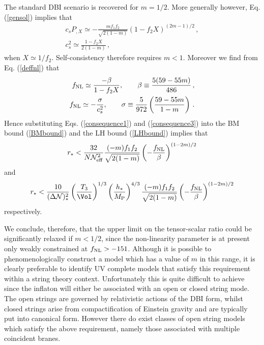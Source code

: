 The standard DBI scenario is recovered for $m=1/2$. 
More generally however, Eq. (\ref{gensol}) implies that  
\begin{eqnarray}
\label{consequence1}
c_sP_{,X} \simeq -\frac{m f_1 f_2}{\sqrt{2(1-m)}} \left( 
1- f_2X \right)^{(2m-1)/2} \,,
\\
c_s^2 \simeq \frac{1-f_2X}{2(1-m)} \,,
\end{eqnarray}
when $X \simeq 1/f_2$. Self-consistency therefore
requires $m<1$. Moreover
we find from Eq. (\ref{deffnl}) that 
\begin{eqnarray}
\label{consequence3}
f_{\mathrm{NL}} \simeq \frac{-\beta}{1-f_2X} , \qquad \beta \equiv \frac{5(59-55m)}{486}
\,,
\\
\label{consequence4}
f_{\mathrm{NL}} \simeq -\frac{\sigma}{c_s^2}, \qquad \sigma \equiv 
\frac{5}{972} \left( \frac{59-55m}{1-m} \right) \,.
\end{eqnarray}
Hence substituting Eqs. (\ref{consequence1}) and (\ref{consequence3}) 
into the BM bound (\ref{BMbound}) and the LH bound (\ref{LHbound}) implies that 
\begin{equation}
\label{weakBMbound}
r_*< \frac{32}{N {\cal{N}}_{\rm eff}^2} \frac{(-m) f_1 f_2}{\sqrt{2(1-m)}}
\left( -\frac{f_{\mathrm{NL}}}{\beta} \right)^{(1-2m)/2}
\end{equation}
and 
\begin{equation}
\label{weakLHbound}
r_* < \frac{10}{(\Delta {\cal{N}})_*^2} \left( \frac{T_3}{\Vol} \right)^{1/3} 
\left( \frac{h_*}{\MP} \right)^{4/3}
\frac{(-m) f_1 f_2}{\sqrt{2(1-m)}}
\left( -\frac{\fnl}{\beta} \right)^{(1-2m)/2}
\end{equation}
respectively. 

We conclude, therefore, that 
the upper limit on the tensor-scalar ratio could be significantly 
relaxed if $m <1/2$, since the non-linearity parameter is at present only 
weakly constrained at $f_{\mathrm{NL}} >-151$. Although it is possible 
to phenomenologically construct a model which has a value of $m$ in this 
range, it is clearly preferable to identify  UV complete models
that satisfy this requirement within a string theory context. 
Unfortunately this is quite difficult to achieve since the inflaton 
will either be associated with an open or closed string mode. 
The open strings are governed by relativistic actions of the 
DBI form, whilst closed strings arise from compactification of Einstein gravity
and are typically put into canonical form.
However there do exist classes of open string
models which satisfy the above requirement, 
namely those associated with multiple coincident branes.

